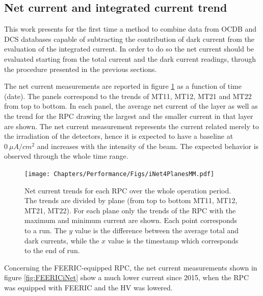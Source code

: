 \subsection{Net current and integrated current trend}
This work presents for the first time a method to combine data from OCDB and DCS databases capable of subtracting the contribution of dark current from the evaluation of the integrated current.
In order to do so the net current should be evaluated starting from the total current and the dark current readings, through the procedure presented in the previous sections.

The net current measurements are reported in figure \ref{fig:iNet4Planes} as a function of time (date).
The panels correspond to the trends of MT11, MT12, MT21 and MT22 from top to bottom.
In each panel, the average net current of the layer as well as the trend for the RPC drawing the largest and the smaller current in that layer are shown.
The net current measurement represents the current related merely to the irradiation of the detectors, hence it is expected to have a baseline at $0\ \mu A/cm^2$ and increases with the intensity of the beam.
The expected behavior is observed through the whole time range.

\begin{figure}[!t]
\begin{center}
\texttt{[image: Chapters/Performance/Figs/iNet4PlanesMM.pdf]}
\caption{Net current trends for each RPC over the whole operation period. The trends are divided by plane (from top to bottom MT11, MT12, MT21, MT22). For each plane only the trends of the RPC with the maximum and minimum current are shown. Each point corresponds to a run. The $y$ value is the difference between the average total and dark currents, while the $x$ value is the timestamp which corresponds to the end of run.}
\label{fig:iNet4Planes}
\end{center}
\end{figure}

Concerning the FEERIC-equipped RPC, the net current measurements shown in figure \ref{fig:FEERICiNet} show a much lower current since 2015, when the RPC was equipped with FEERIC and the HV was lowered.

